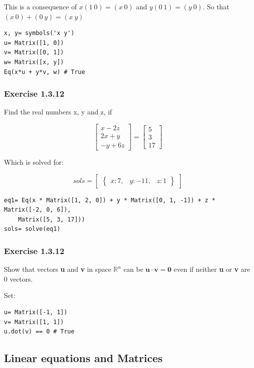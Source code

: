 \documentclass[a4paper]{article}
\begin{document}
This is a consequence of $x(1\ 0) = (x\ 0)$ and $y(0\ 1) = (y\ 0)$. So that
$(x\ 0) + (0\ y) = (x\ y)$

\begin{verbatim}
x, y= symbols('x y')
u= Matrix([1, 0])
v= Matrix([0, 1])
w= Matrix([x, y])
Eq(x*u + y*v, w) # True
\end{verbatim}

\subsubsection{Exercise 1.3.12}

Find the real numbers x, y and z, if

\begin{equation}
\left[\begin{matrix}x - 2 z\\2 x + y\\- y + 6 z\end{matrix}\right] = \left[\begin{matrix}5\\3\\17\end{matrix}\right]
\end{equation}

Which is solved for:

\begin{equation}
sols= \begin{bmatrix}\begin{Bmatrix}x : 7, & y : -11, & z : 1\end{Bmatrix}\end{bmatrix}
\end{equation}

\begin{verbatim}
eq1= Eq(x * Matrix([1, 2, 0]) + y * Matrix([0, 1, -1]) + z * Matrix([-2, 0, 6]),
    Matrix([5, 3, 17]))
sols= solve(eq1)
\end{verbatim}

\subsubsection{Exercise 1.3.12}

Show that vectors \textbf{u} and \textbf{v} in space $\mathbb{R}^n$ can be
$\mathbf{u} \cdot{} \mathbf{v} = \mathbf{0}$ even if neither \textbf{u} or \textbf{v}
are 0 vectors.

Set:

\begin{verbatim}
u= Matrix([-1, 1])
v= Matrix([1, 1])
u.dot(v) == 0 # True
\end{verbatim}

\subsection{Linear equations and Matrices}


\end{document}
